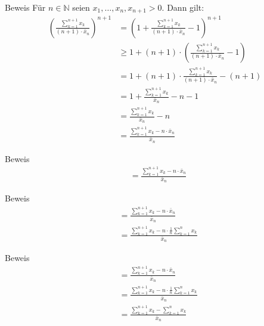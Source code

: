\documentclass[10pt]{beamer}
\def\bN{\mathbb{N}}
\begin{document}
\begin{frame}{Beweis}
    Für \( n \in \bN \) seien \( x_{1}, \ldots, x_{n}, x_{n + 1} > 0 \). Dann gilt:
    \begin{align*}
        \left( \frac{\sum_{k = 1}^{n + 1} x_{k}}{\left( n + 1 \right) \cdot \bar{x}_{n}} \right)^{n + 1}
        & = \left( 1 + \frac{\sum_{k = 1}^{n + 1} x_{k}}{\left( n + 1 \right) \cdot \bar{x}_{n}} - 1 \right)^{n + 1} \\
        & \geq 1 + \left( n + 1 \right) \cdot \left( \frac{\sum_{k = 1}^{n + 1} x_{k}}{\left( n + 1 \right) \cdot \bar{x}_{n}} - 1 \right) \\
        & = 1 + \left( n + 1 \right) \cdot \frac{\sum_{k = 1}^{n + 1} x_{k}}{\left( n + 1 \right) \cdot \bar{x}_{n}} - \left( n + 1 \right) \\
        & = 1 + \frac{\sum_{k = 1}^{n + 1} x_{k}}{\bar{x}_{n}} - n - 1 \\
        & = \frac{\sum_{k = 1}^{n + 1} x_{k}}{\bar{x}_{n}} - n \\
        & = \frac{\sum_{k = 1}^{n + 1} x_{k} - n \cdot \bar{x}_{n}}{\bar{x}_{n}}
    \end{align*}
\end{frame}



\begin{frame}{Beweis}
    \begin{align*}
         & = \frac{\sum_{k = 1}^{n + 1} x_{k} - n \cdot \bar{x}_{n}}{\bar{x}_{n}}
    \end{align*}
\end{frame}



\begin{frame}{Beweis}
    \begin{align*}
         & = \frac{\sum_{k = 1}^{n + 1} x_{k} - n \cdot \bar{x}_{n}}{\bar{x}_{n}} \\
         & = \frac{\sum_{k = 1}^{n + 1} x_{k} - n \cdot \frac{1}{n} \sum_{k = 1}^{n} x_{k}}{\bar{x}_{n}}
    \end{align*}
\end{frame}



\begin{frame}{Beweis}
    \begin{align*}
         & = \frac{\sum_{k = 1}^{n + 1} x_{k} - n \cdot \bar{x}_{n}}{\bar{x}_{n}} \\
         & = \frac{\sum_{k = 1}^{n + 1} x_{k} - n \cdot \frac{1}{n} \sum_{k = 1}^{n} x_{k}}{\bar{x}_{n}} \\
         & = \frac{\sum_{k = 1}^{n + 1} x_{k} - \sum_{k = 1}^{n} x_{k}}{\bar{x}_{n}}
    \end{align*}
\end{frame}
\end{document}
